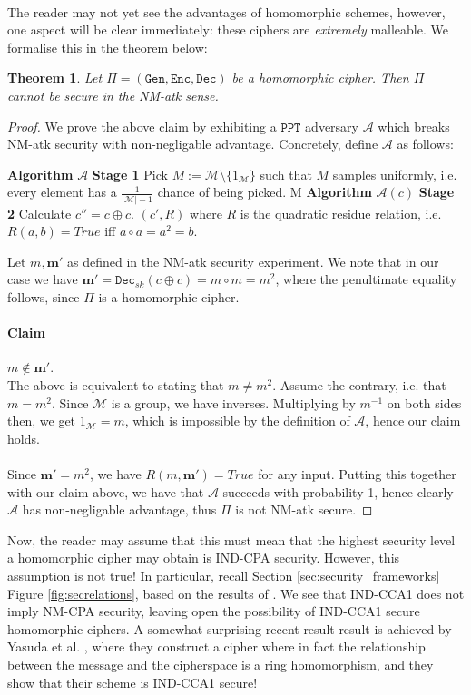 \documentclass{article}
\newtheorem{theorem}{Theorem}[section]
\theoremstyle{definition}
\newcommand{\Enc}{\texttt{Enc}}
\newcommand{\Dec}{\texttt{Dec}}
\newcommand{\Gen}{\texttt{Gen}}
\newcommand{\M}{\mathcal{M}}
\newcommand{\A}{\mathcal{A}}
\newcommand{\PPT}{\texttt{PPT}}
\begin{document}
\paragraph{} The reader may not yet see the advantages of homomorphic schemes,
however, one aspect will be clear immediately: these ciphers are
\textit{extremely} malleable. We formalise this in the theorem below:
\begin{theorem}
  Let $\Pi = (\Gen, \Enc, \Dec)$ be a homomorphic cipher. Then $\Pi$ cannot be
  secure in the NM-atk sense. 
\end{theorem}
\begin{proof}
  We prove the above claim by exhibiting a $\PPT$ adversary $\A$ which breaks
  NM-atk security with non-negligable advantage. Concretely, define $\A$ as
  follows:
  \begin{algorithmic}
    \State \textbf{Algorithm} $\A$ \textbf{Stage 1}
    \State Pick $M := \M \setminus \{1_\M\}$ such that $M$ samples uniformly,
    i.e. every element has a $\frac1{|\M| - 1}$ chance of being picked.
    \State \Return M
    \State
    \State \textbf{Algorithm} $\A(c)$ \textbf{Stage 2}
    \State Calculate $c'' = c \oplus c$.
    \State \Return $(c', R)$ where $R$ is the quadratic residue relation, i.e. $R(a,
    b) = True$ iff $a \circ a = a^2 = b$.
    \State
  \end{algorithmic}
  Let $m, \textbf{m}'$ as defined in the NM-atk security experiment. We note
  that in our case we have $\textbf{m}' = \Dec_{sk}(c \oplus c) = m \circ m =
  m^2$, where the penultimate equality follows, since $\Pi$ is a homomorphic cipher. 
  \paragraph{Claim} $m \not\in \textbf{m}'$. \\
  The above is equivalent to stating that $m \neq m^2$. Assume the contrary,
  i.e. that $m = m^2$. Since $\M$ is a group, we have inverses. Multiplying by
  $m^{-1}$ on both sides then, we get $1_\M = m$, which is impossible by the
  definition of $\A$, hence our claim holds.
  \paragraph{}
  Since $\textbf{m}' = m^2$, we have $R(m, \textbf{m}') = True$ for any input.
  Putting this together with our claim above, we have that $\A$ succeeds with
  probability 1, hence clearly $\A$ has non-negligable advantage, thus $\Pi$
  is not NM-atk secure.
\end{proof}
Now, the reader may assume that this must mean that the highest security level a
homomorphic cipher may obtain is IND-CPA security. However, this assumption is
not true! In particular, recall Section \ref{sec:security_frameworks} Figure
\ref{fig:secrelations}, based on the results of \cite{bellaresecurityrelations}.
We see that IND-CCA1 does not imply NM-CPA security, leaving open the
possibility of IND-CCA1 secure homomorphic ciphers. A somewhat surprising recent
result result is achieved by Yasuda et al. \cite{Yasuda2018}, where they construct a
cipher where in fact the relationship between the message and the cipherspace is
a ring homomorphism, and they show that their scheme is IND-CCA1 secure!
\end{document}
